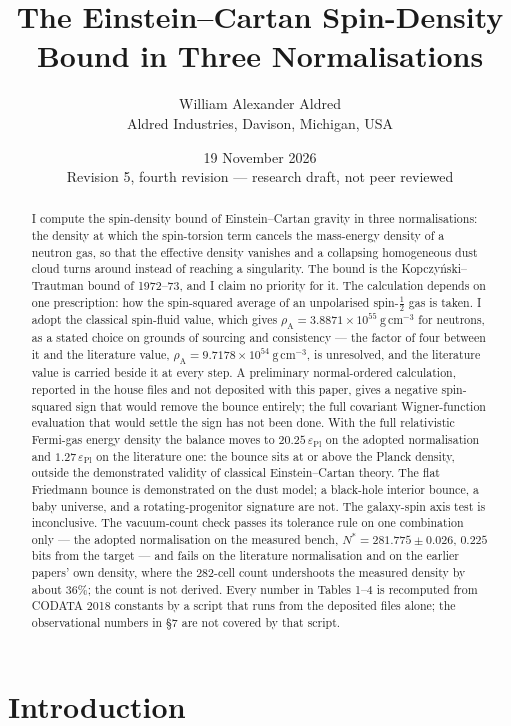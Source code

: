 \documentclass[11pt]{article}
\title{The Einstein--Cartan Spin-Density Bound in Three Normalisations}
\author{William Alexander Aldred\\ Aldred Industries, Davison, Michigan, USA}
\date{19 November 2026\\ Revision 5, fourth revision --- research draft, not peer reviewed}
\newcommand{\rhoA}{\rho_{\mathrm{A}}}
\newcommand{\epsPl}{\varepsilon_{\mathrm{Pl}}}
\begin{document}
\maketitle

\begin{abstract}
I compute the spin-density bound of Einstein--Cartan gravity in three
normalisations: the density at which the spin-torsion term cancels the
mass-energy density of a neutron gas, so that the effective density
vanishes and a collapsing homogeneous dust cloud turns around instead of
reaching a singularity. The bound is the Kopczy\'nski--Trautman bound of
1972--73, and I claim no priority for it. The calculation depends on one
prescription: how the spin-squared average of an unpolarised
spin-$\tfrac12$ gas is taken. I adopt the classical spin-fluid value,
which gives $\rhoA = 3.8871\times10^{55}\ \mathrm{g\,cm^{-3}}$ for
neutrons, as a stated choice on grounds of sourcing and consistency ---
the factor of four between it and the literature value,
$\rhoA = 9.7178\times10^{54}\ \mathrm{g\,cm^{-3}}$, is unresolved, and
the literature value is carried beside it at every step. A
preliminary normal-ordered calculation, reported in the house files and
not deposited with this paper, gives a negative spin-squared sign that
would remove the bounce entirely; the full covariant Wigner-function
evaluation that would settle the sign has not been done.
With the full relativistic Fermi-gas energy density the balance moves to
$20.25\,\epsPl$ on the adopted normalisation and $1.27\,\epsPl$ on the
literature one: the bounce sits at or above the Planck density, outside
the demonstrated validity of classical Einstein--Cartan theory. The flat
Friedmann bounce is demonstrated on the dust model; a black-hole interior bounce, a baby
universe, and a rotating-progenitor signature are not. The galaxy-spin
axis test is inconclusive. The vacuum-count check passes its tolerance
rule on one combination only --- the adopted normalisation on the
measured bench, $N^* = 281.775 \pm 0.026$, $0.225$ bits from the target
--- and fails on the literature normalisation and on the earlier papers'
own density, where the 282-cell count undershoots the measured density
by about $36\%$; the count is not derived. Every number in Tables 1--4
is recomputed from CODATA 2018 constants \cite{CODATA18} by a script
that runs from the deposited files alone; the observational numbers in
\S7 are not covered by that script.
\end{abstract}

\section{Introduction}
\end{document}
